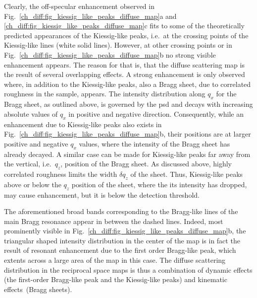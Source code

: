 Clearly, the off-specular enhancement observed in Fig.~\ref{ch_diff:fig_kiessig_like_peaks_diffuse_map}a and \ref{ch_diff:fig_kiessig_like_peaks_diffuse_map}c fits to some of the theoretically predicted appearances of the Kiessig-like peaks, i.e.~at the crossing points of the Kiessig-like lines (white solid lines). However, at other crossing points or in Fig.~\ref{ch_diff:fig_kiessig_like_peaks_diffuse_map}b no strong visible enhancement appears. The reason for that is, that the diffuse scattering map is the result of several overlapping effects. A strong enhancement is only observed where, in addition to the Kiessig-like peaks,   also a Bragg sheet, due to correlated roughness in the sample, appears. The intensity distribution along $q_x$ for the Bragg sheet, as outlined above, is governed by the \gls{psd} and decays with increasing absolute values of $q_x$ in positive and negative direction. Consequently, while an enhancement due to Kiessig-like peaks also exists in Fig.~\ref{ch_diff:fig_kiessig_like_peaks_diffuse_map}b, their positions are at larger positive and negative $q_x$ values, where the intensity of the Bragg sheet has already decayed. A similar case can be made for Kiessig-like peaks far away from the vertical, i.e.~$q_z$, position of the Bragg sheet. As discussed above, highly correlated roughness limits the width $\delta q_z$ of the sheet. Thus, Kiessig-like peaks above or below the $q_z$ position of the sheet, where the its intensity has dropped, may cause enhancement, but it is below the detection threshold.

The aforementioned broad bands corresponding to the Bragg-like lines of the main Bragg resonance appear in between the dashed lines. Indeed, most prominently visible in Fig.~\ref{ch_diff:fig_kiessig_like_peaks_diffuse_map}b, the triangular shaped intensity distribution in the center of the map is in fact the result of resonant enhancement due to the first order Bragg-like peak, which extents across a large area of the map in this case.
The diffuse scattering distribution in the reciprocal space maps is thus a combination of dynamic effects (the first-order Bragg-like peak and the Kiessig-like peaks) and kinematic effects~(Bragg sheets).

